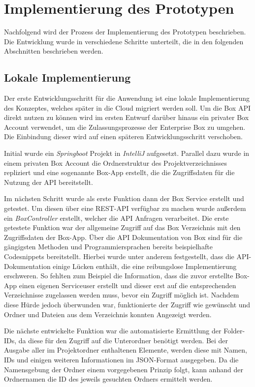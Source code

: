 \section{Implementierung des Prototypen}

Nachfolgend wird der Prozess der Implementierung des Prototypen beschrieben. Die Entwicklung wurde in verschiedene Schritte unterteilt, die in den folgenden Abschnitten beschrieben werden.

\subsection{Lokale Implementierung}
Der erste Entwicklungsschritt für die Anwendung ist eine lokale Implementierung des Konzeptes, welches später in die Cloud migriert werden soll. Um die Box \ac{API} direkt nutzen zu können wird im ersten Entwurf darüber hinaus ein privater Box Account verwendet, um die Zulassungsprozesse der Enterprise Box zu umgehen. Die Einbindung dieser wird auf einen späteren Entwicklungsschritt verschoben.

Initial wurde ein \textit{\gls{Springboot}} Projekt in \textit{\gls{IntelliJ}} aufgesetzt. Parallel dazu wurde in einem privaten Box Account die Ordnerstruktur des Projektverzeichnisses repliziert und eine sogenannte Box-App erstellt, die die Zugriffsdaten für die Nutzung der \ac{API} bereitstellt.

Im nächsten Schritt wurde als erste Funktion dann der Box Service erstellt und getestet. Um diesen über eine \ac{REST}-\ac{API} verfügbar zu machen wurde außerdem ein \textit{BoxController} erstellt, welcher die \ac{API} Anfragen verarbeitet. Die erste getestete Funktion war der allgemeine Zugriff auf das Box Verzeichnis mit den Zugriffsdaten der Box-App. Über die \ac{API} Dokumentation von Box sind für die gängigsten Methoden und Programmiersprachen bereits beispielhafte Codesnippets bereitstellt. Hierbei wurde unter anderem festgestellt, dass die \ac{API}-Dokumentation einige Lücken enthält, die eine reibungslose Implementierung erschweren. So fehlten zum Beispiel die Information, dass die zuvor erstellte Box-App einen eigenen Serviceuser erstellt und dieser erst auf die entsprechenden Verzeichnisse zugelassen werden muss, bevor ein Zugriff möglich ist. Nachdem diese Hürde jedoch überwunden war, funktionierte der Zugriff wie gewünscht und Ordner und Dateien aus dem Verzeichnis konnten Angezeigt werden.

Die nächste entwickelte Funktion war die automatisierte Ermittlung der Folder-IDs, da diese für den Zugriff auf die Unterordner benötigt werden. Bei der Ausgabe aller im Projektordner enthaltenen Elemente, werden diese mit Namen, IDs und einigen weiteren Informationen im \ac{JSON}-Format ausgegeben. Da die Namensgebung der Ordner einem vorgegebenen Prinzip folgt, kann anhand der Ordnernamen die ID des jeweils gesuchten Ordners ermittelt werden. \pagebreak

